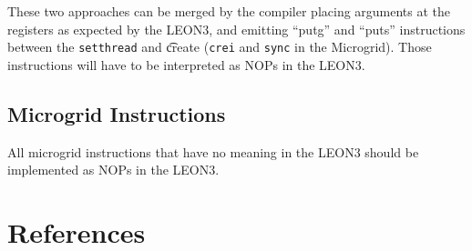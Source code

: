 \documentclass[a4paper,11pt]{article}
\newcommand{\leon}{{LEON3}\xspace}
\begin{document}
These two approaches can be merged by the compiler placing arguments at the registers as expected by the \leon, and emitting ``putg'' and ``puts'' instructions between the {\tt setthread} and {\t create} ({\tt crei} and {\tt sync} in the Microgrid). Those instructions will have to be interpreted as {NOPs} in the \leon.

\subsection{Microgrid Instructions}
All microgrid instructions that have no meaning in the \leon should be implemented as NOPs in the \leon.

\section{References}


\end{document}
